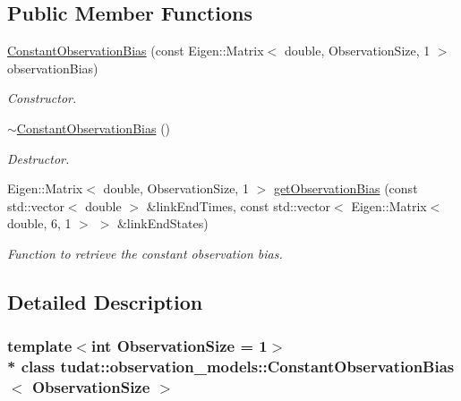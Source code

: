 \subsection*{Public Member Functions}
\begin{DoxyCompactItemize}
\item 
\hyperlink{classtudat_1_1observation__models_1_1ConstantObservationBias_a216252c1c33f3cbcee7bf3114fb1c720}{Constant\+Observation\+Bias} (const Eigen\+::\+Matrix$<$ double, Observation\+Size, 1 $>$ observation\+Bias)
\begin{DoxyCompactList}\small\item\em Constructor. \end{DoxyCompactList}\item 
\hyperlink{classtudat_1_1observation__models_1_1ConstantObservationBias_ab6f48f10712444f0ab736eea7bd89a47}{$\sim$\+Constant\+Observation\+Bias} ()\hypertarget{classtudat_1_1observation__models_1_1ConstantObservationBias_ab6f48f10712444f0ab736eea7bd89a47}{}\label{classtudat_1_1observation__models_1_1ConstantObservationBias_ab6f48f10712444f0ab736eea7bd89a47}

\begin{DoxyCompactList}\small\item\em Destructor. \end{DoxyCompactList}\item 
Eigen\+::\+Matrix$<$ double, Observation\+Size, 1 $>$ \hyperlink{classtudat_1_1observation__models_1_1ConstantObservationBias_aaf3dcb13a6094ddb048226b7579f6de1}{get\+Observation\+Bias} (const std\+::vector$<$ double $>$ \&link\+End\+Times, const std\+::vector$<$ Eigen\+::\+Matrix$<$ double, 6, 1 $>$ $>$ \&link\+End\+States)
\begin{DoxyCompactList}\small\item\em Function to retrieve the constant observation bias. \end{DoxyCompactList}\end{DoxyCompactItemize}


\subsection{Detailed Description}
\subsubsection*{template$<$int Observation\+Size = 1$>$\\*
class tudat\+::observation\+\_\+models\+::\+Constant\+Observation\+Bias$<$ Observation\+Size $>$}

